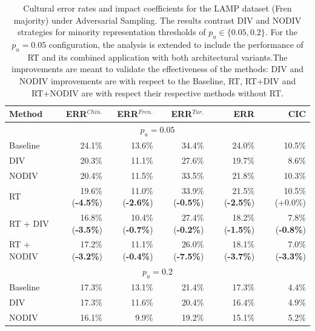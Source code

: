 %
%
\begin{table}
\centering
\small
\begin{tabular}{lrrrrr}
\toprule
\textbf{Method} & \textbf{ERR$^{Chin.}$} & \textbf{ERR$^{Fren.}$} & \textbf{ERR$^{Tur.}$} & \textbf{ERR} & \textbf{CIC} \\
\midrule
\multicolumn{6}{c}{$p_u=0.05$} \\
\midrule
Baseline & 24.1\%&	13.6\%&	34.4\%&	24.0\%&	10.5\%\\	
DIV & 20.3\%&	11.1\%&	27.6\%&	19.7\%&	8.6\%\\	
NODIV & 20.4\%&	11.5\%&	33.5\%&	21.8\%&	10.3\%\\
\midrule
RT              & 19.6\% (\textbf{-4.5\%}) & 11.0\% (\textbf{-2.6\%}) & 33.9\% (\textbf{-0.5\%}) & 21.5\% (\textbf{-2.5\%}) & 10.5\% (+0.0\%) \\
RT + DIV        & 16.8\% (\textbf{-3.5\%}) & 10.4\% (\textbf{-0.7\%}) & 27.4\% (\textbf{-0.2\%}) & 18.2\% (\textbf{-1.5\%}) & 7.8\% (\textbf{-0.8\%}) \\
RT + NODIV      & 17.2\% (\textbf{-3.2\%}) & 11.1\% (\textbf{-0.4\%}) & 26.0\% (\textbf{-7.5\%}) & 18.1\% (\textbf{-3.7\%}) & 7.0\% (\textbf{-3.3\%}) \\
\midrule
\multicolumn{6}{c}{$p_u=0.2$} \\
\midrule
Baseline & 17.3\% & 13.1\% & 21.4\% & 17.3\% & 4.4\% \\
DIV & 17.3\% & 11.6\% & 20.4\% & 16.4\% & 4.9\% \\
NODIV & 16.1\% & 9.9\% & 19.2\% & 15.1\% & 5.2\% \\
\bottomrule
\end{tabular}
\caption{Cultural error rates and impact coefficients for the LAMP dataset (Fren majority) under Adversarial Sampling. The results contrast DIV and NODIV strategies for minority representation thresholds of $p_u \in \{0.05, 0.2\}$. For the $p_u = 0.05$ configuration, the analysis is extended to include the performance of RT and its combined application with both architectural variants.The improvements are meant to validate the effectiveness of the methods: DIV and NODIV improvements are with respect to the Baseline, RT, RT+DIV and RT+NODIV are with respect their respective methods without RT.}
\label{ch3:tab:ADVLF}
\end{table}
%
%
